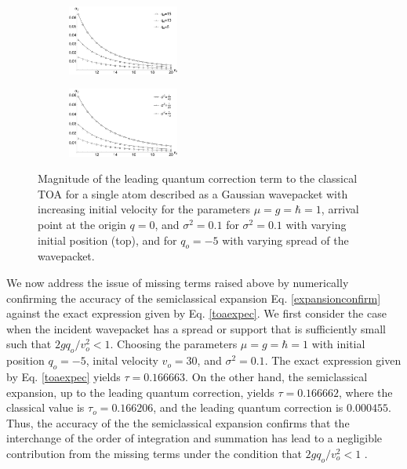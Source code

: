 \documentclass[%
 reprint,
 amsmath,amssymb,
 aps,
]{revtex4-1}
\begin{document}
\begin{figure}[t!]
\begin{subfigure}
\centering
\includegraphics[width=0.4\textwidth]{mi_equal_mg_diff_start_lead_overlay}
\label{fig:diffqo}
\end{subfigure}
\begin{subfigure}
\centering
\includegraphics[width=0.4\textwidth]{mi_equal_mg_diff_sigma_lead_overlay}
\label{fig:diffsigma}
\end{subfigure}
\caption{Magnitude of the leading quantum correction term to the classical TOA for a single atom described as a Gaussian wavepacket with increasing initial velocity for the parameters $\mu=g=\hbar=1$, arrival point at the origin $q=0$, and $\sigma^2=0.1$ for $\sigma^2=0.1$ with varying initial position (top), and for $q_o=-5$ with varying spread of the wavepacket.}
\label{fig:sigmaandqo}
\end{figure}

We now address the issue of missing terms raised above by numerically confirming the accuracy of the semiclassical expansion Eq. \eqref{expansionconfirm} against the exact expression given by Eq. \eqref{toaexpec}. We first consider the case when the incident wavepacket has a spread or support that is sufficiently small such that $2g q_o /v_o^2 <1$. Choosing the parameters $\mu=g=\hbar=1$ with initial position $q_o=-5$, inital velocity $v_o=30$, and $\sigma^2=0.1$. The exact expression given by Eq. \eqref{toaexpec} yields $\tau=0.166663$. On the other hand, the semiclassical expansion, up to the leading quantum correction, yields $\tau=0.166662$, where the classical value is $\tau_o=0.166206$, and the leading quantum correction is $0.000455$. Thus, the accuracy of the the semiclassical expansion confirms that the interchange of the order of integration and summation has lead to a negligible contribution from the missing terms under the  condition that $2g q_o /v_o^2 < 1$ \cite{wongBook,wongPAMS1980,galaponPRSA2017}.
\end{document}
